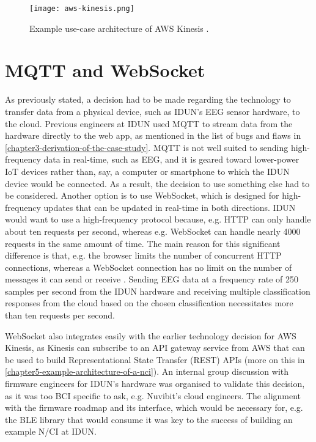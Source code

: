 \begin{figure}[!ht]
  \centering
  \texttt{[image: aws-kinesis.png]}
  \caption[Example use-case architecture of AWS Kinesis]{Example use-case architecture of AWS Kinesis \citep{amazon_web_services_inc_amazon_nodate}.}
  \label{fig:aws-kinesis}
\end{figure}

\section*{MQTT and WebSocket}
\label{chapter4-mqtt-and-websocket}

As previously stated, a decision had to be made regarding the technology to transfer data from a physical device, such as IDUN's EEG sensor hardware, to the cloud. Previous engineers at IDUN used MQTT to stream data from the hardware directly to the web app, as mentioned in the list of bugs and flaws in \autoref{chapter3-derivation-of-the-case-study}. MQTT is not well suited to sending high-frequency data in real-time, such as EEG, and it is geared toward lower-power IoT devices rather than, say, a computer or smartphone to which the IDUN device would be connected. As a result, the decision to use something else had to be considered. Another option is to use WebSocket, which is designed for high-frequency updates that can be updated in real-time in both directions. IDUN would want to use a high-frequency protocol because, e.g. HTTP can only handle about ten requests per second, whereas e.g. WebSocket can handle nearly 4000 requests in the same amount of time. The main reason for this significant difference is that, e.g. the browser limits the number of concurrent HTTP connections, whereas a WebSocket connection has no limit on the number of messages it can send or receive \citep{luecke_http_2018}. Sending EEG data at a frequency rate of 250 samples per second from the IDUN hardware and receiving multiple classification responses from the cloud based on the chosen classification necessitates more than ten requests per second.

WebSocket also integrates easily with the earlier technology decision for AWS Kinesis, as Kinesis can subscribe to an API gateway service from AWS that can be used to build Representational State Transfer (REST) APIs (more on this in \autoref{chapter5-example-architecture-of-a-nci}). An internal group discussion with firmware engineers for IDUN's hardware was organised to validate this decision, as it was too BCI specific to ask, e.g. Nuvibit's cloud engineers. The alignment with the firmware roadmap and its interface, which would be necessary for, e.g. the BLE library that would consume it was key to the success of building an example N/CI at IDUN.

